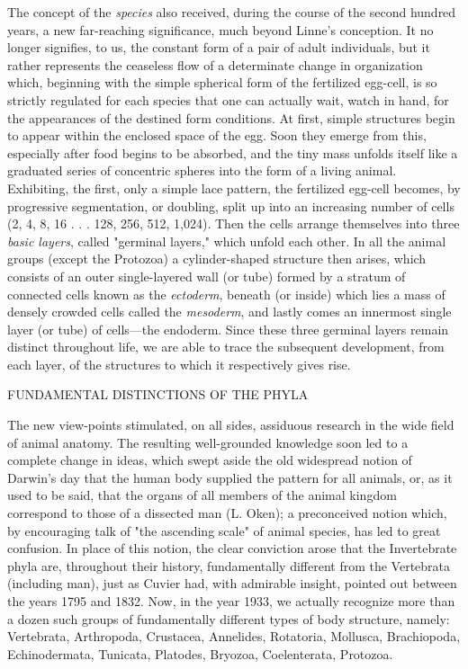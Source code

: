 The concept of the \textit{species} also received, during the course of the second hundred years, a
new far-reaching significance, much beyond Linne's conception. It no longer signifies, to us,
the constant form of a pair of adult individuals, but it rather represents the ceaseless flow of a
determinate change in organization which, beginning with the simple spherical form of the
fertilized egg-cell, is so strictly regulated for each species that one can actually wait, watch in
hand, for the appearances of the destined form conditions. At first, simple structures begin to
appear within the enclosed space of the egg. Soon they emerge from this, especially after
food begins to be absorbed, and the tiny mass unfolds itself like a graduated series of
concentric spheres into the form of a living animal. Exhibiting, the first, only a simple lace
pattern, the fertilized egg-cell becomes, by progressive segmentation, or doubling, split up
into an increasing number of cells (2, 4, 8, 16 . . . 128, 256, 512, 1,024). Then the cells
arrange themselves into three \textit{basic layers}, called "germinal layers," which unfold each other.
In all the animal groups (except the Protozoa) a cylinder-shaped structure then arises, which
consists of an outer single-layered wall (or tube) formed by a stratum of connected cells
known as the \textit{ectoderm}, beneath (or inside) which lies a mass of densely crowded cells called
the \textit{mesoderm}, and lastly comes an innermost single layer (or tube) of cells—the endoderm.
Since these three germinal layers remain distinct throughout life, we are able to trace the
subsequent development, from each layer, of the structures to which it respectively gives rise.

FUNDAMENTAL DISTINCTIONS OF THE PHYLA

The new view-points stimulated, on all sides, assiduous research in the wide field of animal
anatomy. The resulting well-grounded knowledge soon led to a complete change in ideas,
which swept aside the old widespread notion of Darwin's day that the human body supplied
the pattern for all animals, or, as it used to be said, that the organs of all members of the
animal kingdom correspond to those of a dissected man (L. Oken); a preconceived notion
which, by encouraging talk of "the ascending scale" of animal species, has led to great
confusion. In place of this notion, the clear conviction arose that the Invertebrate phyla are,
throughout their history, fundamentally different from the Vertebrata (including man), just as
Cuvier had, with admirable insight, pointed out between the years 1795 and 1832. Now, in
the year 1933, we actually recognize more than a dozen such groups of fundamentally
different types of body structure, namely: Vertebrata, Arthropoda, Crustacea, Annelides,
Rotatoria, Mollusca, Brachiopoda, Echinodermata, Tunicata, Platodes, Bryozoa,
Coelenterata, Protozoa.

